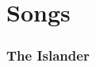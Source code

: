 \documentclass{article}
\begin{document}
    \tableofcontents

    \newpage

    \part{Songs}

    \newpage

    \section{The Islander}
    

\end{document}
